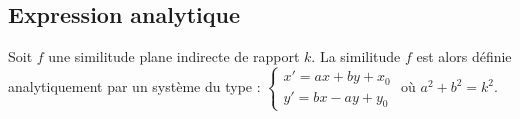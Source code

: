 %            
%            
%            
      \subsection{Expression analytique}
            Soit $f$ une similitude plane indirecte de rapport $k$.
            La similitude $f$ est alors d\'efinie analytiquement par un syst\`eme du type :
            $\left\lbrace \begin{array}{l} x' = a x + b y + x_0 \\ y' = b x - a y + y_0 \end{array} \right.$
            o\`u $a^2 + b^2 = k^2$.
